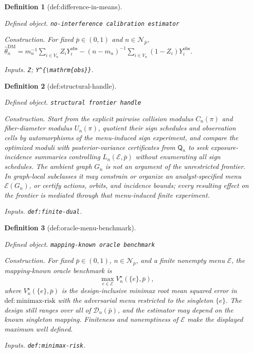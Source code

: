 \documentclass{article}
\newtheorem{definition}{Definition}
\begin{document}
\begin{definition}[def:difference-in-means]\label{def:difference-in-means}
\par\smallskip\noindent\emph{Defined object.} \texttt{no-\allowbreak{}interference calibration estimator}
\par\smallskip\noindent\emph{Construction.} For fixed \(\bar p\in(0,1)\) and \(n\in\mathcal N_{\bar p}\), \(\widehat\theta_n^{\mathrm{DM}}=m_n^{-1}\sum_{i\in V_n}Z_iY_i^{\mathrm{obs}}-(n-m_n)^{-1}\sum_{i\in V_n}(1-Z_i)Y_i^{\mathrm{obs}}\).
\par\smallskip\noindent\emph{Inputs.} \texttt{Z}; \texttt{Y\textasciicircum{}\{\textbackslash{}\allowbreak{}mathrm\{obs\}\allowbreak{}\}\allowbreak{}}.
\end{definition}

\begin{definition}[def:structural-handle]\label{def:structural-handle}
\par\smallskip\noindent\emph{Defined object.} \texttt{structural frontier handle}
\par\smallskip\noindent\emph{Construction.} Start from the explicit pairwise collision modulus \(C_n(\pi)\) and fiber-diameter modulus \(U_n(\pi)\), quotient their sign schedules and observation cells by automorphisms of the menu-induced sign experiment, and compare the optimized moduli with posterior-variance certificates from \(\mathsf Q_n\) to seek exposure-incidence summaries controlling \(L_n(\mathcal E,\bar p)\) without enumerating all sign schedules. The ambient graph \(G_n\) is not an argument of the unrestricted frontier. In graph-local subclasses it may constrain or organize an analyst-specified menu \(\mathcal E(G_n)\), or certify actions, orbits, and incidence bounds; every resulting effect on the frontier is mediated through that menu-induced finite experiment.
\par\smallskip\noindent\emph{Inputs.} \texttt{def:\allowbreak{}finite-\allowbreak{}dual}.
\end{definition}

\begin{definition}[def:oracle-menu-benchmark]\label{def:oracle-menu-benchmark}
\par\smallskip\noindent\emph{Defined object.} \texttt{mapping-\allowbreak{}known oracle benchmark}
\par\smallskip\noindent\emph{Construction.} For fixed \(\bar p\in(0,1)\), \(n\in\mathcal N_{\bar p}\), and a finite nonempty menu \(\mathcal E\), the mapping-known oracle benchmark is
\[
 \max_{e\in\mathcal E}V_n^\star(\{e\},\bar p),
\]
where \(V_n^\star(\{e\},\bar p)\) is the design-inclusive minimax root mean squared error in \(\mathrm{def{:}minimax\text{-}risk}\) with the adversarial menu restricted to the singleton \(\{e\}\). The design still ranges over all of \(\mathcal D_n(\bar p)\), and the estimator may depend on the known singleton mapping. Finiteness and nonemptiness of \(\mathcal E\) make the displayed maximum well defined.
\par\smallskip\noindent\emph{Inputs.} \texttt{def:\allowbreak{}minimax-\allowbreak{}risk}.
\end{definition}
\end{document}
